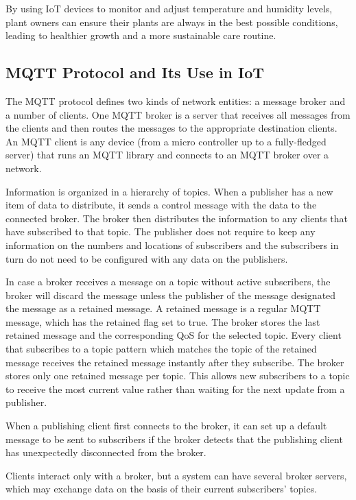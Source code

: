 \documentclass[12pt,a4paper,oneside,english]{book}
\begin{document}
By using IoT devices to monitor and adjust temperature and humidity levels, plant owners can ensure their plants are always in the best possible conditions, leading to healthier growth and a more sustainable care routine.







\subsection{MQTT Protocol and Its Use in IoT}
The MQTT protocol defines two kinds of network entities: a message broker and a number of clients. One MQTT broker is a server that receives all messages from the clients and then routes the messages to the appropriate destination clients. An MQTT client is any device (from a micro controller up to a fully-fledged server) that runs an MQTT library and connects to an MQTT broker over a network.

Information is organized in a hierarchy of topics. When a publisher has a new item of data to distribute, it sends a control message with the data to the connected broker. The broker then distributes the information to any clients that have subscribed to that topic. The publisher does not require to keep any information on the numbers and locations of subscribers and the subscribers in turn do not need to be configured with any data on the publishers.

In case a broker receives a message on a topic without active subscribers, the broker will discard the message unless the publisher of the message designated the message as a retained message. A retained message is a regular MQTT message, which has the retained flag set to true. The broker stores the last retained message and the corresponding QoS for the selected topic. Every client that subscribes to a topic pattern which matches the topic of the retained message receives the retained message instantly after they subscribe. The broker stores only one retained message per topic. This allows new subscribers to a topic to receive the most current value rather than waiting for the next update from a publisher.

When a publishing client first connects to the broker, it can set up a default message to be sent to subscribers if the broker detects that the publishing client has unexpectedly disconnected from the broker.

Clients interact only with a broker, but a system can have several broker servers, which may exchange data on the basis of their current subscribers' topics.
\end{document}
